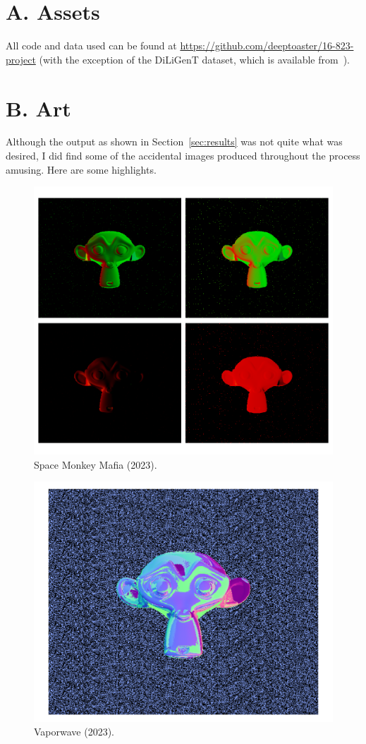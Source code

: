 \section*{A. Assets}
All code and data used can be found at
\url{https://github.com/deeptoaster/16-823-project} (with the exception of the
DiLiGenT dataset, which is available from~\cite{shi}).
\section*{B. Art}
Although the output as shown in Section~\ref{sec:results} was not quite what
was desired, I did find some of the accidental images produced throughout the
process amusing. Here are some highlights.
\begin{figure}[h]
  \includegraphics[width=\columnwidth]{images/space-monkey-mafia}
  \caption{Space Monkey Mafia (2023).}
\end{figure}
\begin{figure}[h]
  \includegraphics[width=\columnwidth]{images/vaporwave}
  \caption{Vaporwave (2023).}
\end{figure}


